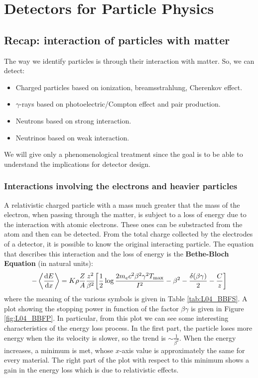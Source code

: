 \documentclass[../../main/main.tex]{subfiles}
\begin{document}
\chapter{Detectors for Particle Physics}


\section{Recap: interaction of particles with matter}
The way we identify particles is through their interaction with matter. So, we can detect:
\begin{itemize}
    \item Charged particles based on ionization, breamsstrahlung, Cherenkov effect.
    \item \( \gamma \)-rays based on photoelectric/Compton effect and pair production.
    \item Neutrons based on strong interaction.
    \item Neutrinos based on weak interaction.
\end{itemize}
We will give only a phenomenological treatment since the goal is to be able to understand the implications for detector design.

\subsection{Interactions involving the electrons and heavier particles}
A relativistic charged particle with a mass much greater that the mass of the electron, when passing through the matter, is subject to a loss of energy due to the interaction with atomic electrons. These ones can be substracted from the atom and then can be detected. From the total charge collected by the electrodes of a detector, it is possible to know the original interacting particle. The equation that describes this interaction and the loss of energy is the \textbf{Bethe-Bloch Equation} (in natural units):
\begin{equation}
    - \left\langle \dv{E}{x} \right\rangle
    =
    K \rho \frac{Z}{A} \frac{z^2}{\beta^2}
    \qty[ \frac{1}{2} \log \frac{2 m_e c^2 \beta^2 \gamma^2 T_\mathrm{max}}{I^2} - \beta^2 - \frac{\delta(\beta \gamma)}{2} - \frac{C}{z} ]
    \label{eq:L04_BBF}
\end{equation}
where the meaning of the various symbols is given in Table \ref{tab:L04_BBFS}. A plot showing the stopping power in function of the factor \( \beta \gamma \) is given in Figure \ref{fig:L04_BBFP}. In particular, from this plot we can see some interesting characteristics of the energy loss process. In the first part, the particle loses more energy when the its velocity is slower, so the trend is \( \sim \frac{1}{\beta^2} \). When the energy increases, a minimum is met, whose \( x \)-axis value is approximately the same for every material. The right part of the plot with respect to this minimum shows a gain in the energy loss which is due to relativistic effects.
\end{document}
